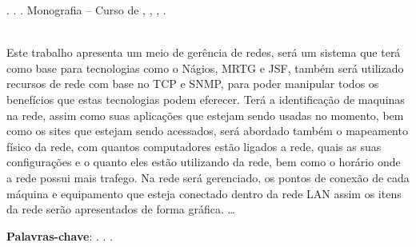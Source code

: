 
\begin{OnehalfSpacing} 

\noindent \imprimirAutorCitacaoMaiuscula. {\bfseries\imprimirtitulo}. {\imprimirdata}.  Monografia -- Curso de {\MakeUppercase\imprimircurso}, {\imprimirinstituicao}, {\imprimirlocal}, {\imprimirdata}.

\vspace{\onelineskip}
\vspace{\onelineskip}
\vspace{\onelineskip}
\vspace{\onelineskip}

\begin{resumo}
~\\
\noindent Este trabalho apresenta um meio de gerência de redes, será um sistema
que terá como base para tecnologias como o Nágios, MRTG e JSF, também será
utilizado recursos de rede com base no TCP e SNMP, para poder manipular todos os
benefícios que estas tecnologias podem eferecer.
Terá a identificação de maquinas na rede, assim como suas aplicações que
estejam sendo usadas no momento, bem como os sites que estejam sendo acessados,
será abordado também o mapeamento físico da rede, com quantos computadores estão
ligados a rede, quais as suas configurações e o quanto eles estão utilizando da
rede, bem como o horário onde a rede possui mais trafego.
Na rede será gerenciado, os pontos de conexão de cada máquina e equipamento que
esteja conectado dentro da rede LAN assim os itens da rede serão apresentados
de forma gráfica.
\ldots

\vspace{\onelineskip}
\vspace*{\fill}
\noindent \textbf{Palavras-chave}: \imprimirPalavraChaveUm. \imprimirPalavraChaveDois. \imprimirPalavraChaveTres.
\vspace{\onelineskip}
\end{resumo}

\end{OnehalfSpacing}
